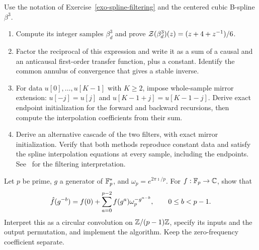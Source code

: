 
\begin{exo}
\label{exo-calcul-spline-iir}
Use the notation of Exercise~\ref{exo-spline-filtering} and the centered
cubic B-spline $\beta^3$.
\begin{enumerate}
\item Compute its integer samples $\beta_d^3$ and prove
$\mathcal{Z}(\beta_d^3)(z)=(z+4+z^{-1})/6$.
\item Factor the reciprocal of this expression and write it as a sum of a
causal and an anticausal first-order transfer function, plus a constant.
Identify the common annulus of convergence that gives a stable inverse.
\item For data $u[0],\ldots,u[K-1]$ with $K\geq2$, impose whole-sample
mirror extension: $u[-j]=u[j]$ and $u[K-1+j]=u[K-1-j]$.
Derive exact endpoint initialization for the forward and backward
recursions, then compute the interpolation coefficients from their sum.
\item Derive an alternative cascade of the two filters, with exact mirror
initialization. Verify that both methods reproduce constant data and
satisfy the spline interpolation equations at every sample, including the
endpoints. See~\cite{unser-spline,unser-splines-perfect-fit} for the
filtering interpretation.
\end{enumerate}
\end{exo}


\begin{exo}
\label{exo-chirp-transform-finis-corps}
Let $p$ be prime, $g$ a generator of $\mathbb{F}_p^*$, and
$\omega_p=e^{2\pi\imath/p}$. For $f:\mathbb{F}_p\to\mathbb{C}$, show that
\[
 \hat{f}(g^{-b})=f(0)+\sum_{a=0}^{p-2}f(g^a)\omega_p^{-g^{a-b}},
 \qquad 0\leq b<p-1.
\]
Interpret this as a circular convolution on $\mathbb{Z}/(p-1)\mathbb{Z}$, specify its
inputs and the output permutation, and implement the algorithm. Keep the
zero-frequency coefficient separate.
\end{exo}


